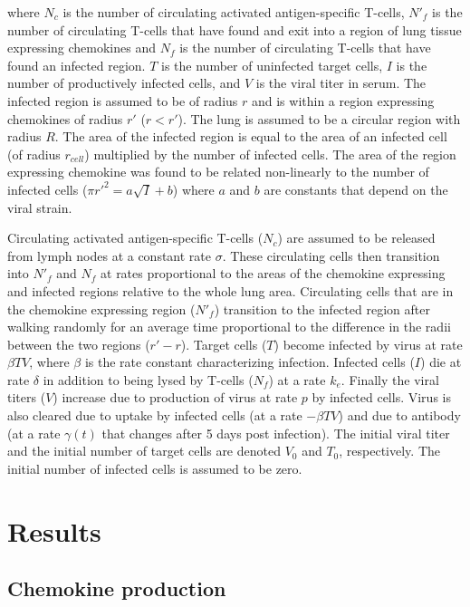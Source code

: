 \documentclass[10pt]{article}
\begin{document}
where $N_{c}$ is the number of circulating activated antigen-specific T-cells, $N'_{f}$ is the number of circulating T-cells that have found and exit into a region of lung tissue expressing chemokines and $N_{f}$ is the number of circulating T-cells that have found an infected region. $T$ is the number of uninfected target cells, $I$ is the number of productively infected cells, and $V$ is the viral titer in serum. The infected region is assumed to be of radius $r$ and is within a region expressing chemokines of radius $r'$ ($r  < r'$). The lung is assumed to be a circular region with radius $R$. The area of the infected region is equal to the area of an infected cell (of radius $r_{cell}$) multiplied by the number of infected cells. The area of the region expressing chemokine was found to be related non-linearly to the number of infected cells ($\pi r'^{2} = a \sqrt{I} + b$) where $a$ and $b$ are constants that depend on the viral strain.

Circulating activated antigen-specific T-cells ($N_{c}$) are assumed to be released from lymph nodes at a constant rate $\sigma$. These circulating cells then transition into $N'_{f}$ and $N_{f}$ at rates proportional to the areas of the chemokine expressing and infected regions relative to the whole lung area. Circulating cells that are in the chemokine expressing region ($N'_{f}$) transition to the infected region after walking randomly for an average time proportional to the difference in the radii between the two regions ($r' - r$). Target cells ($T$) become infected by virus at rate $\beta TV$, where $\beta$ is the rate constant characterizing infection. Infected cells ($I$) die at rate $\delta$ in addition to being lysed by T-cells ($N_{f}$) at a rate $k_{e}$. Finally the viral titers ($V$) increase due to production of virus at rate $p$ by infected cells. Virus is also cleared due to uptake by infected cells (at a rate $- \beta TV$) and due to antibody (at a rate $\gamma (t)$ that changes after 5 days post infection). The initial viral titer and the initial number of target cells are denoted $V_{0}$ and $T_{0}$, respectively. The initial number of infected cells is assumed to be zero.


\section*{Results}

\subsection*{Chemokine production}
\end{document}

